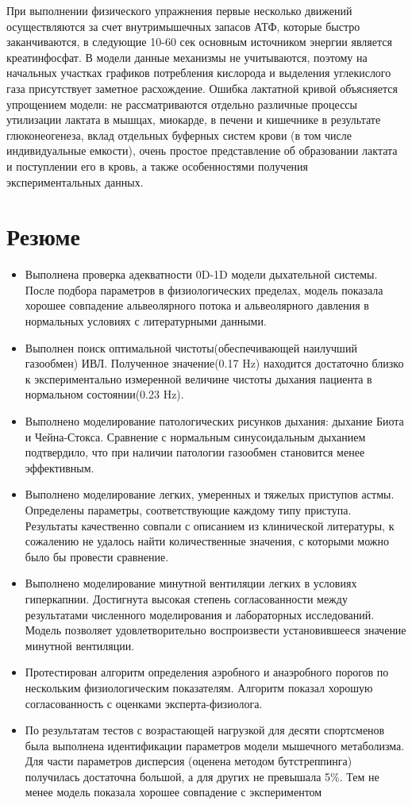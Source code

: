При выполнении физического упражнения первые несколько движений осуществляются за счет внутримышечных запасов АТФ, которые быстро заканчиваются, в следующие 10-60 сек основным источником энергии является креатинфосфат. В модели данные механизмы не учитываются, поэтому на начальных участках графиков потребления кислорода и выделения углекислого газа присутствует заметное расхождение. Ошибка лактатной кривой объясняется упрощением модели: не рассматриваются отдельно различные процессы утилизации лактата в мышцах, миокарде, в печени и кишечнике в результате глюконеогенеза, вклад отдельных буферных систем крови (в том числе индивидуальные емкости), очень простое представление об образовании лактата и поступлении его в кровь, а также особенностями получения экспериментальных данных.


\clearpage
\section{Резюме}
\begin{itemize}
\item 
Выполнена проверка адекватности 0D-1D модели дыхательной системы. После подбора параметров в физиологических пределах, модель показала хорошее совпадение альвеолярного потока и альвеолярного давления в нормальных условиях с литературными данными.
\item 
Выполнен поиск оптимальной чистоты(обеспечивающей наилучший газообмен) ИВЛ. Полученное значение(0.17 Hz) находится достаточно близко к экспериментально измеренной величине чистоты дыхания пациента в нормальном состоянии(0.23 Hz).
\item
Выполнено моделирование патологических рисунков дыхания: дыхание Биота и Чейна-Стокса. Сравнение с нормальным синусоидальным дыханием подтвердило, что при наличии патологии газообмен становится менее эффективным. 
\item
Выполнено моделирование легких, умеренных и тяжелых приступов астмы. Определены параметры, соответствующие каждому типу приступа. Результаты качественно совпали с описанием из клинической литературы, к сожалению не удалось найти количественные значения, с которыми можно было бы провести сравнение.
\item
Выполнено моделирование минутной вентиляции легких в условиях гиперкапнии. Достигнута высокая степень согласованности между результатами численного моделирования и лабораторных исследований. Модель позволяет удовлетворительно воспроизвести установившееся значение минутной вентиляции. 
\item
Протестирован алгоритм определения аэробного и анаэробного порогов по нескольким физиологическим показателям. Алгоритм показал хорошую согласованность с оценками эксперта-физиолога.
\item 
По результатам тестов с возрастающей нагрузкой для десяти спортсменов была выполнена идентификации параметров модели мышечного метаболизма. Для части параметров дисперсия (оценена методом бутстреппинга) получилась достаточна большой, а для других не превышала 5\%. Тем не менее модель показала хорошее совпадение с экспериментом


\end{itemize}